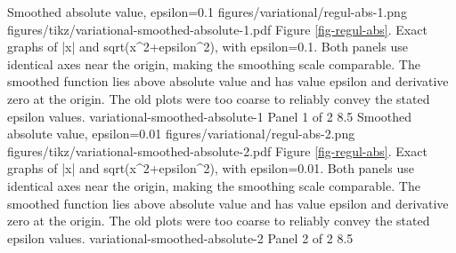 {Smoothed absolute value, epsilon=0.1}
{figures/variational/regul-abs-1.png}
{figures/tikz/variational-smoothed-absolute-1.pdf}
{Figure \ref{fig-regul-abs}.}
{Exact graphs of |x| and sqrt(x\textasciicircum{}2+epsilon\textasciicircum{}2), with epsilon=0.1. Both panels use identical axes near the origin, making the smoothing scale comparable. The smoothed function lies above absolute value and has value epsilon and derivative zero at the origin. The old plots were too coarse to reliably convey the stated epsilon values.}
{variational-smoothed-absolute-1}
{Panel 1 of 2}
{8.5}
{Smoothed absolute value, epsilon=0.01}
{figures/variational/regul-abs-2.png}
{figures/tikz/variational-smoothed-absolute-2.pdf}
{Figure \ref{fig-regul-abs}.}
{Exact graphs of |x| and sqrt(x\textasciicircum{}2+epsilon\textasciicircum{}2), with epsilon=0.01. Both panels use identical axes near the origin, making the smoothing scale comparable. The smoothed function lies above absolute value and has value epsilon and derivative zero at the origin. The old plots were too coarse to reliably convey the stated epsilon values.}
{variational-smoothed-absolute-2}
{Panel 2 of 2}
{8.5}
